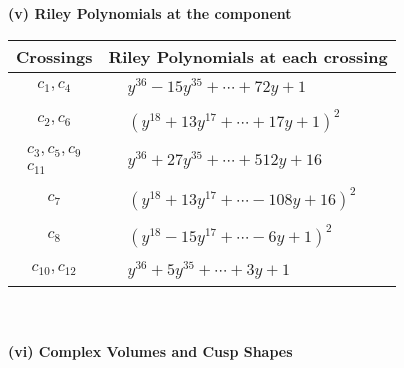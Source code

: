 \documentclass[1p]{elsarticle_modified}
\theoremstyle{definition}
\begin{document}
\newpage\renewcommand{\arraystretch}{1}
\flushleft \textbf{(v) Riley Polynomials at the component}\newline \\
\begin{tabular}{m{50pt}|m{274pt}}
Crossings & \hspace{64pt}Riley Polynomials at each crossing \\
\hline $$\begin{aligned}c_{1},c_{4}\end{aligned}$$&$\begin{aligned}
&y^{36}-15 y^{35}+\cdots+72 y+1
\end{aligned}$\\
\hline $$\begin{aligned}c_{2},c_{6}\end{aligned}$$&$\begin{aligned}
&(y^{18}+13 y^{17}+\cdots+17 y+1)^{2}
\end{aligned}$\\
\hline $$\begin{aligned}c_{3},c_{5},c_{9}\\c_{11}\end{aligned}$$&$\begin{aligned}
&y^{36}+27 y^{35}+\cdots+512 y+16
\end{aligned}$\\
\hline $$\begin{aligned}c_{7}\end{aligned}$$&$\begin{aligned}
&(y^{18}+13 y^{17}+\cdots-108 y+16)^{2}
\end{aligned}$\\
\hline $$\begin{aligned}c_{8}\end{aligned}$$&$\begin{aligned}
&(y^{18}-15 y^{17}+\cdots-6 y+1)^{2}
\end{aligned}$\\
\hline $$\begin{aligned}c_{10},c_{12}\end{aligned}$$&$\begin{aligned}
&y^{36}+5 y^{35}+\cdots+3 y+1
\end{aligned}$\\
\hline
\end{tabular}\\~\\
\newpage\flushleft \textbf{(vi) Complex Volumes and Cusp Shapes}
\end{document}

